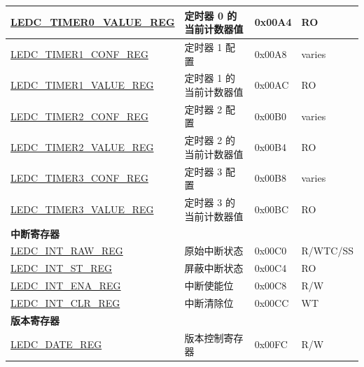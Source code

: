 \begin{longtable}{ | p{5.5cm} | p{7cm} | p{1.3cm} | p{1.7cm} | }
\hyperref[regdesc:LEDCTIMERXVALUEREG]{LEDC\_TIMER0\_VALUE\_REG} & 定时器 0 的当前计数器值 & 0x00A4 & RO \\ \hline
\hyperref[regdesc:LEDCTIMERXCONFREG]{LEDC\_TIMER1\_CONF\_REG} & 定时器 1 配置 & 0x00A8 & varies \\ \hline
\hyperref[regdesc:LEDCTIMERXVALUEREG]{LEDC\_TIMER1\_VALUE\_REG} & 定时器 1 的当前计数器值 & 0x00AC & RO \\ \hline
\hyperref[regdesc:LEDCTIMERXCONFREG]{LEDC\_TIMER2\_CONF\_REG} & 定时器 2 配置 & 0x00B0 & varies \\ \hline
\hyperref[regdesc:LEDCTIMERXVALUEREG]{LEDC\_TIMER2\_VALUE\_REG} & 定时器 2 的当前计数器值 & 0x00B4 & RO \\ \hline
\hyperref[regdesc:LEDCTIMERXCONFREG]{LEDC\_TIMER3\_CONF\_REG} & 定时器 3 配置 & 0x00B8 & varies \\ \hline
\hyperref[regdesc:LEDCTIMERXVALUEREG]{LEDC\_TIMER3\_VALUE\_REG} & 定时器 3 的当前计数器值 & 0x00BC & RO \\ \hline
\multicolumn{4}{|l|}{\textbf{中断寄存器}} \\ \hline
\hyperref[regdesc:LEDCINTRAWREG]{LEDC\_INT\_RAW\_REG} & 原始中断状态 & 0x00C0 & R/WTC/SS \\ \hline
\hyperref[regdesc:LEDCINTSTREG]{LEDC\_INT\_ST\_REG} & 屏蔽中断状态 & 0x00C4 & RO \\ \hline
\hyperref[regdesc:LEDCINTENAREG]{LEDC\_INT\_ENA\_REG} & 中断使能位 & 0x00C8 & R/W \\ \hline
\hyperref[regdesc:LEDCINTCLRREG]{LEDC\_INT\_CLR\_REG} & 中断清除位 & 0x00CC & WT \\ \hline
\multicolumn{4}{|l|}{\textbf{版本寄存器}} \\ \hline
\hyperref[regdesc:LEDCDATEREG]{LEDC\_DATE\_REG} & 版本控制寄存器 & 0x00FC & R/W \\ \hline
\end{longtable}
